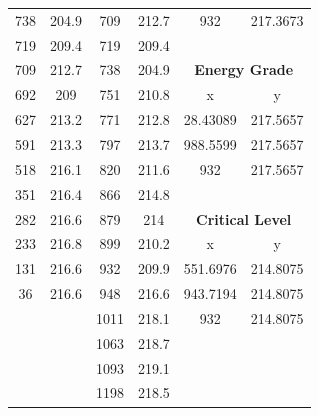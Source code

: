 \begin{center}
\begin{tabular}{|cc||cc||cc|}
    738      & 204.9                  & 709  & 212.7                         & 932      & 217.3673                           \\
    719      & 209.4                  & 719  & 209.4                         &          &                                    \\
    709      & 212.7                  & 738  & 204.9                         & \multicolumn{2}{c|}{\textbf{Energy Grade }}    \\ 
    \cline{5-6}
    692      & 209                    & 751  & 210.8                         & x        & y                                  \\
    627      & 213.2                  & 771  & 212.8                         & 28.43089 & 217.5657                           \\
    591      & 213.3                  & 797  & 213.7                         & 988.5599 & 217.5657                           \\
    518      & 216.1                  & 820  & 211.6                         & 932      & 217.5657                           \\
    351      & 216.4                  & 866  & 214.8                         &          &                                    \\
    282      & 216.6                  & 879  & 214                           & \multicolumn{2}{c|}{\textbf{Critical Level }}  \\ 
    \cline{5-6}
    233      & 216.8                  & 899  & 210.2                         & x        & y                                  \\
    131      & 216.6                  & 932  & 209.9                         & 551.6976 & 214.8075                           \\
    36       & 216.6                  & 948  & 216.6                         & 943.7194 & 214.8075                           \\
             &                        & 1011 & 218.1                         & 932      & 214.8075                           \\
             &                        & 1063 & 218.7                         &          &                                    \\
             &                        & 1093 & 219.1                         &          &                                    \\
             &                        & 1198 & 218.5                         &          &                                    \\

\end{tabular}
\end{center}
